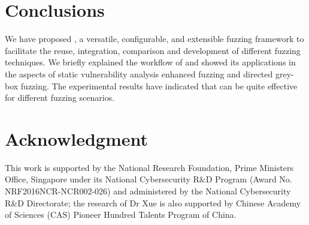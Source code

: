 \begin{table}[t]
	\small
	\caption{Comparisons between Different Fuzzers (\Circle: not supported, \LEFTcircle: partially supported, \CIRCLE: fully supported)}
	\label{tbl:cmp_fuzz}
	\vspace{-10pt}
\end{table}
 

\section{Conclusions}

We have proposed {\FOT}, a versatile, configurable, and extensible fuzzing framework to facilitate the reuse, integration, comparison and development of different fuzzing techniques. We briefly explained the workflow of {\FOT} and showed its applications in the aspects of static vulnerability analysis enhanced fuzzing and directed grey-box fuzzing. The experimental results have indicated that {\FOT} can be quite effective for different fuzzing scenarios.
 
\section*{Acknowledgment}
This work is supported by the National Research Foundation, Prime Ministers Office, Singapore under its National Cybersecurity R\&D Program (Award No. NRF2016NCR-NCR002-026) and administered by the National Cybersecurity R\&D Directorate; the research of Dr Xue is also supported by Chinese Academy of Sciences (CAS) Pioneer Hundred Talents Program of China.


